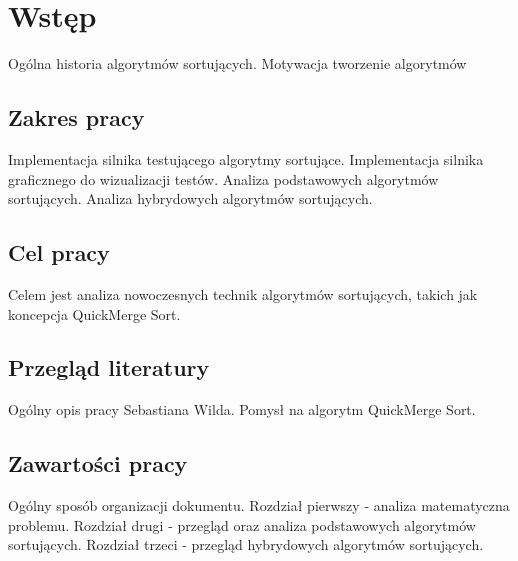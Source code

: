 \chapter{Wstęp}
\thispagestyle{chapterBeginStyle}

Ogólna historia algorytmów sortujących. Motywacja tworzenie algorytmów 

\section{Zakres pracy}
Implementacja silnika testującego algorytmy sortujące. Implementacja silnika graficznego do wizualizacji testów.
Analiza podstawowych algorytmów sortujących. Analiza hybrydowych algorytmów sortujących.


\section{Cel pracy}
Celem jest analiza nowoczesnych technik algorytmów sortujących, takich jak koncepcja QuickMerge Sort.

\section{Przegląd literatury}
Ogólny opis pracy Sebastiana Wilda. Pomysł na algorytm QuickMerge Sort.

\section{Zawartości pracy}
Ogólny sposób organizacji dokumentu.
Rozdział pierwszy - analiza matematyczna problemu.
Rozdział drugi - przegląd oraz analiza podstawowych algorytmów sortujących.
Rozdział trzeci - przegląd hybrydowych algorytmów sortujących.